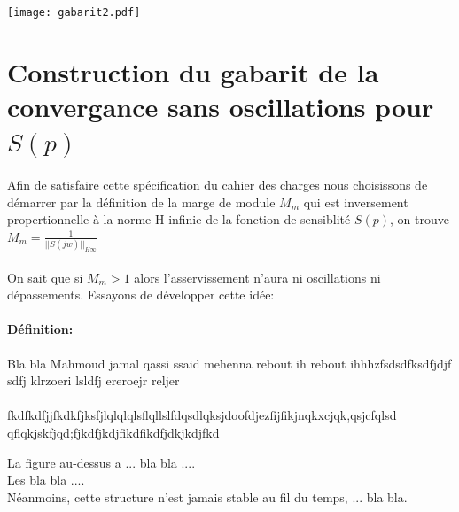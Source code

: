 \documentclass[12pt, a4paper, openany]{report}
\begin{document}
  \begin{center}
    \texttt{[image: gabarit2.pdf]}
    \label{fig6}
  \end{center}
  
 \section{Construction du gabarit de la convergance sans oscillations pour $S(p)$} 
  
  \paragraph{}
  Afin de satisfaire cette spécification du cahier des charges nous choisissons de démarrer par la définition de la marge de module $M_{m} $ qui est inversement propertionnelle à la norme H infinie de la fonction de sensiblité $S(p) $, on trouve $M_{m}=\frac{1}{||S(jw)||_{H\infty}} $ 
  
  \paragraph{}
  On sait que si $ M_{m}>1 $ alors l'asservissement n'aura ni oscillations ni dépassements. Essayons de développer cette idée: \\
  
  
  
      
  
  
  
  \paragraph{Définition:}
  
Bla bla Mahmoud jamal qassi ssaid mehenna rebout ih rebout ihhhzfsdsdfksdfjdjf sdfj klrzoeri lsldfj 
ereroejr reljer
  
  \paragraph{}
  fkdfkdfjjfkdkfjksfjlqlqlqlsflqllslfdqsdlqksjdoofdjezfijfikjnqkxcjqk,qsjcfqlsd
  qflqkjskfjqd;fjkdfjkdjfikdfikdfjdkjkdjfkd  
   
 La figure au-dessus a ... bla bla ....\\
 
 Les bla bla ....\\
 
 Néanmoins, cette structure n’est jamais stable au fil du temps, ... bla bla.\\
  
\end{document}
